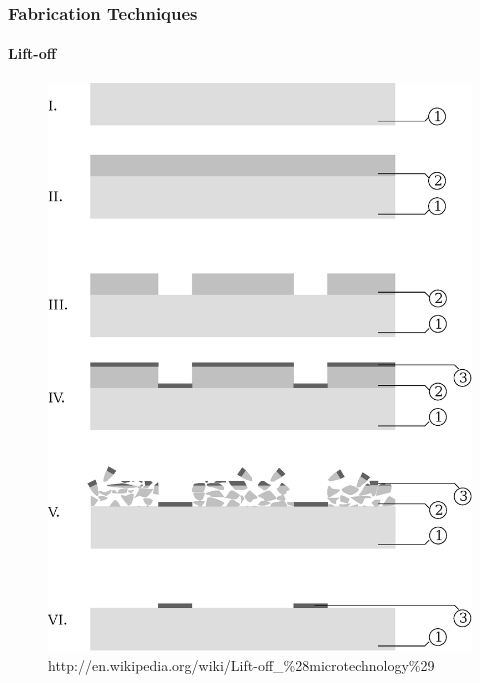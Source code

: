 \documentclass{beamer}
\begin{document}
\begin{frame}
    \frametitle{Fabrication Techniques}
    \framesubtitle{Lift-off}
    \begin{figure}[!htb]
        \centering
        \includegraphics[height=0.6\textheight]{img/lift-off.eps}
        \caption{http://en.wikipedia.org/wiki/Lift-off\_\%28microtechnology\%29}
    \end{figure}
\end{frame}

\end{document}
